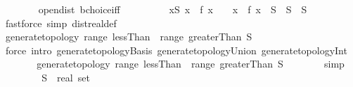 \begin{isabellebody}
\ \ \ \ \ \ \isamarkupfalse%
\ open{\isacharunderscore}{\kern0pt}dist\ bchoice{\isacharunderscore}{\kern0pt}iff\ \isacommand{{\isachardot}{\kern0pt}{\isachardot}{\kern0pt}}\isamarkupfalse%
\isanewline
\ \ \ \ \isamarkupfalse%
\ \isamarkupfalse%
\ {\isacharasterisk}{\kern0pt}{\isacharcolon}{\kern0pt}\ {\isachardoublequoteopen}{\isacharparenleft}{\kern0pt}{\isasymUnion}x{\isasymin}S{\isachardot}{\kern0pt}\ {\isacharbraceleft}{\kern0pt}x\ {\isacharminus}{\kern0pt}\ f\ x\ {\isacharless}{\kern0pt}{\isachardot}{\kern0pt}{\isachardot}{\kern0pt}{\isacharbraceright}{\kern0pt}\ {\isasyminter}\ {\isacharbraceleft}{\kern0pt}{\isachardot}{\kern0pt}{\isachardot}{\kern0pt}{\isacharless}{\kern0pt}\ x\ {\isacharplus}{\kern0pt}\ f\ x{\isacharbraceright}{\kern0pt}{\isacharparenright}{\kern0pt}\ {\isacharequal}{\kern0pt}\ S{\isachardoublequoteclose}\ {\isacharparenleft}{\kern0pt}\ {\isachardoublequoteopen}{\isacharquery}{\kern0pt}S\ {\isacharequal}{\kern0pt}\ S{\isachardoublequoteclose}{\isacharparenright}{\kern0pt}\isanewline
\ \ \ \ \ \ \isamarkupfalse%
\ {\isacharparenleft}{\kern0pt}fastforce\ simp{\isacharcolon}{\kern0pt}\ dist{\isacharunderscore}{\kern0pt}real{\isacharunderscore}{\kern0pt}def{\isacharparenright}{\kern0pt}\isanewline
\ \ \ \ \isamarkupfalse%
\ \isamarkupfalse%
\ {\isachardoublequoteopen}generate{\isacharunderscore}{\kern0pt}topology\ {\isacharparenleft}{\kern0pt}range\ lessThan\ {\isasymunion}\ range\ greaterThan{\isacharparenright}{\kern0pt}\ {\isacharquery}{\kern0pt}S{\isachardoublequoteclose}\isanewline
\ \ \ \ \ \ \isamarkupfalse%
\ {\isacharparenleft}{\kern0pt}force\ intro{\isacharcolon}{\kern0pt}\ generate{\isacharunderscore}{\kern0pt}topology{\isachardot}{\kern0pt}Basis\ generate{\isacharunderscore}{\kern0pt}topology{\isacharunderscore}{\kern0pt}Union\ generate{\isacharunderscore}{\kern0pt}topology{\isachardot}{\kern0pt}Int{\isacharparenright}{\kern0pt}\isanewline
\ \ \ \ \isamarkupfalse%
\ \isamarkupfalse%
\ {\isachardoublequoteopen}generate{\isacharunderscore}{\kern0pt}topology\ {\isacharparenleft}{\kern0pt}range\ lessThan\ {\isasymunion}\ range\ greaterThan{\isacharparenright}{\kern0pt}\ S{\isachardoublequoteclose}\isanewline
\ \ \ \ \ \ \isamarkupfalse%
\ simp\isanewline
\ \ \isamarkupfalse%
\isanewline
\ \ \ \ \isamarkupfalse%
\ S\ {\isacharcolon}{\kern0pt}{\isacharcolon}{\kern0pt}\ {\isachardoublequoteopen}real\ set{\isachardoublequoteclose}\isanewline

\end{isabellebody}
